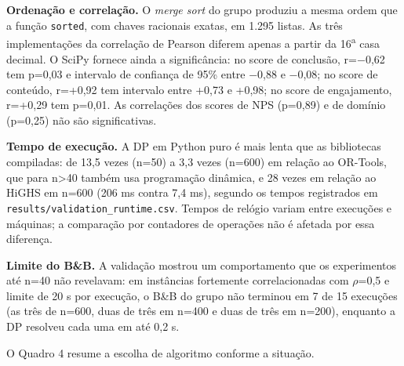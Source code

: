 \documentclass[12pt,a4paper]{article}
\newcommand{\secao}[1]{\par\vspace{1.2em}\noindent{\bfseries #1}\par\vspace{0.8em}\nopagebreak}
\begin{document}
\textbf{Ordenação e correlação.} O \textit{merge sort} do grupo produziu a mesma ordem que a função \texttt{sorted}, com chaves racionais exatas, em 1.295 listas. As três implementações da correlação de Pearson diferem apenas a partir da 16\textsuperscript{a} casa decimal. O SciPy fornece ainda a significância: no score de conclusão, r=\ensuremath{-}0,62 tem p=0,03 e intervalo de confiança de 95\% entre \ensuremath{-}0,88 e \ensuremath{-}0,08; no score de conteúdo, r=+0,92 tem intervalo entre +0,73 e +0,98; no score de engajamento, r=+0,29 tem p=0,01. As correlações dos scores de NPS (p=0,89) e de domínio (p=0,25) não são significativas.

\textbf{Tempo de execução.} A DP em Python puro é mais lenta que as bibliotecas compiladas: de 13,5 vezes (n=50) a 3,3 vezes (n=600) em relação ao OR-Tools, que para n>40 também usa programação dinâmica, e 28 vezes em relação ao HiGHS em n=600 (206 ms contra 7,4 ms), segundo os tempos registrados em \texttt{results/validation\_runtime.csv}. Tempos de relógio variam entre execuções e máquinas; a comparação por contadores de operações não é afetada por essa diferença.

\textbf{Limite do B\&B.} A validação mostrou um comportamento que os experimentos até n=40 não revelavam: em instâncias fortemente correlacionadas com \ensuremath{\rho}=0,5 e limite de 20 s por execução, o B\&B do grupo não terminou em 7 de 15 execuções (as três de n=600, duas de três em n=400 e duas de três em n=200), enquanto a DP resolveu cada uma em até 0,2 s.

\secao{9 DISCUSSÃO: ESCOLHA DO ALGORITMO}
O Quadro 4 resume a escolha de algoritmo conforme a situação.
\end{document}
